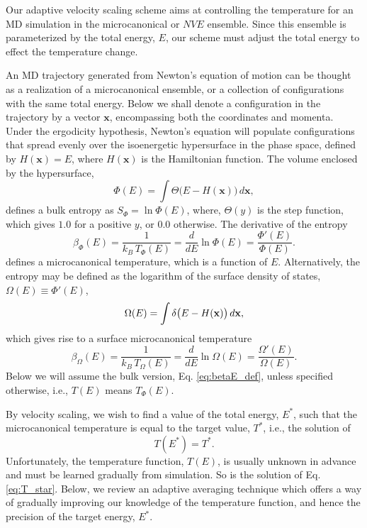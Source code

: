 \documentclass[reprint]{revtex4-1}
\begin{document}
Our adaptive velocity scaling scheme aims at
controlling the temperature for an
MD simulation in the microcanonical or $NVE$ ensemble.
%
Since this ensemble is parameterized by
the total energy, $E$,
our scheme must adjust the total energy
to effect the temperature change.

An MD trajectory generated from
Newton's equation of motion
can be thought as a realization
of a microcanonical ensemble,
or a collection of configurations
with the same total energy.
%
Below we shall denote a configuration in the trajectory
by a vector $\mathbf x$,
encompassing both the coordinates and momenta.
%
Under the ergodicity hypothesis,
Newton's equation will populate configurations
that spread evenly over
the isoenergetic hypersurface in the phase space,
defined by
$H(\mathbf x) = E$,
where $H(\mathbf x)$ is the Hamiltonian function.
%
The volume enclosed by the hypersurface,
%
\begin{equation}
  \Phi(E)
  =
  \int
    \Theta\bigl( E - H(\mathbf x) \bigr)
    \, d\mathbf x
  ,
  \label{eq:PhiE}
\end{equation}
%
defines a bulk entropy as $S_\Phi = \ln \Phi(E)$,
where, $\Theta(y)$ is the step function,
which gives $1.0$ for a positive $y$, or $0.0$ otherwise.
%
The derivative of the entropy
%
\begin{equation}
  \beta_\Phi(E)
  =
  \frac{1}{ k_B \, T_\Phi(E) }
  =
  \frac{ d }{ dE }
  \ln \Phi(E)
  =
  \frac{ \Phi'(E) }
       { \Phi(E)  }
  .
  \label{eq:betaE_def}
\end{equation}
%
defines a microcanonical temperature,
which is a function of $E$.
%
Alternatively, the entropy may be defined
as the logarithm of the surface density of states,
$\Omega(E) \equiv \Phi'(E)$,
%
\begin{equation}
  \Omega(E)
  =
  \int
    \delta\bigl( E - H(\mathbf x) \bigr)
    \, d\mathbf x
  ,
  \notag
\end{equation}
%
which gives rise to a surface microcanonical temperature
%
\begin{equation}
  \beta_\Omega(E)
  =
  \frac{1}{ k_B \, T_\Omega(E) }
  =
  \frac{ d }{ dE }
  \ln \Omega(E)
  =
  \frac{ \Omega'(E) }
       { \Omega(E)  }
  .
  \label{eq:betaE_surf_def}
\end{equation}
%
Below we will assume the bulk version, Eq. \eqref{eq:betaE_def},
unless specified otherwise,
i.e., $T(E)$ means $T_\Phi(E)$.


By velocity scaling, we wish to
find a value of the total energy, $E^*$,
such that the microcanonical temperature
is equal to the target value, $T^*$,
i.e., the solution of
%
\begin{equation}
  T(E^*)
  =
  T^*
  .
  \label{eq:T_star}
\end{equation}
%
Unfortunately, the temperature function, $T(E)$,
is usually unknown in advance
and must be learned gradually from simulation.
%
So is the solution of Eq. \eqref{eq:T_star}.
%
Below, we review an adaptive averaging technique
which offers a way of gradually improving
our knowledge of the temperature function,
and hence the precision of the target energy, $E^*$.
\end{document}
